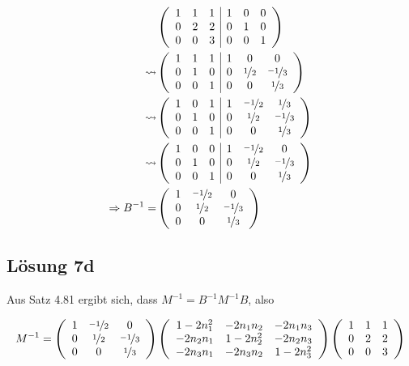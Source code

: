 \documentclass[main.tex]{subfiles}
\begin{document}
\begin{align*}
    & \eqmatrix{ccc|ccc}{
        1 & 1 & 1    &    1 & 0 & 0 \\
        0 & 2 & 2    &    0 & 1 & 0 \\
        0 & 0 & 3    &    0 & 0 & 1
    }\\
    \leadsto & \eqmatrix{ccc|ccc}{
        1 & 1 & 1    &    1 & 0   & 0 \\
        0 & 1 & 0    &    0 & \nicefrac{1}{2} & \nicefrac{-1}{3} \\
        0 & 0 & 1    &    0 & 0   & \nicefrac{1}{3}
    }\\
    \leadsto & \eqmatrix{ccc|ccc}{
        1 & 0 & 1    &    1 & \nicefrac{-1}{2} & \nicefrac{1}{3} \\
        0 & 1 & 0    &    0 & \nicefrac{1}{2}  & \nicefrac{-1}{3} \\
        0 & 0 & 1    &    0 & 0    & \nicefrac{1}{3}
    }\\
    \leadsto & \eqmatrix{ccc|ccc}{
        1 & 0 & 0    &    1 & \nicefrac{-1}{2} & 0 \\
        0 & 1 & 0    &    0 & \nicefrac{1}{2}  & \nicefrac{-1}{3} \\
        0 & 0 & 1    &    0 & 0    & \nicefrac{1}{3}
    }\\
    \Rightarrow B^{-1} = & \eqmatrix{ccc}{
        1 & \nicefrac{-1}{2} & 0 \\
        0 & \nicefrac{1}{2} & \nicefrac{-1}{3} \\
        0 & 0 & \nicefrac{1}{3}
    }\\
\end{align*}

\subsection*{Lösung 7d}
Aus Satz 4.81 ergibt sich, dass $M^{-1} = B^{-1} M^{-1} B$, also

\begin{align*}
    M^{-1} &= \eqmatrix{ccc}{
        1 & \nicefrac{-1}{2} & 0 \\
        0 & \nicefrac{1}{2} & \nicefrac{-1}{3} \\
        0 & 0 & \nicefrac{1}{3}
    } \eqmatrix{ccc}{
        1-2 n_1^2   & -2 n_1 n_2 & -2 n_1 n_3 \\
        -2 n_2 n_1 & 1-2 n_2^2   & -2 n_2 n_3 \\
        -2 n_3 n_1 & -2 n_3 n_2 & 1-2 n_3^2
    } \eqmatrix{ccc}{
        1 & 1 & 1 \\
        0 & 2 & 2 \\
        0 & 0 & 3
    }\\
\end{align*}
\end{document}
